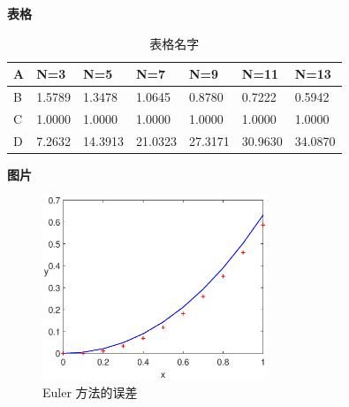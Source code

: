 \documentclass[12pt,cn]{homework}
\begin{document}

\clearpage


\noindent\textbf{表格}

\begin{table}[ht!]
\caption{表格名字}
\label{tab:3}
\centering
\begin{tabular}{lllllll}
\toprule
  A & N=3 &N=5 & N=7 & N=9 & N=11 & N=13\\
\midrule
  B & 1.5789 & 1.3478 &1.0645&0.8780 &0.7222 &0.5942   \\
   C &  1.0000 &1.0000 &1.0000 &1.0000 &1.0000 &1.0000  \\
D &7.2632 &14.3913 &21.0323 &27.3171 &30.9630 &34.0870   \\
\bottomrule
\end{tabular}
\end{table}


\noindent\textbf{图片}

\begin{figure}[htp!]
\centering
  \includegraphics[width=0.6\textwidth]{Euler.eps}
   \caption{Euler 方法的误差}
   \label{fig:error1}
\end{figure}


\end{document}

